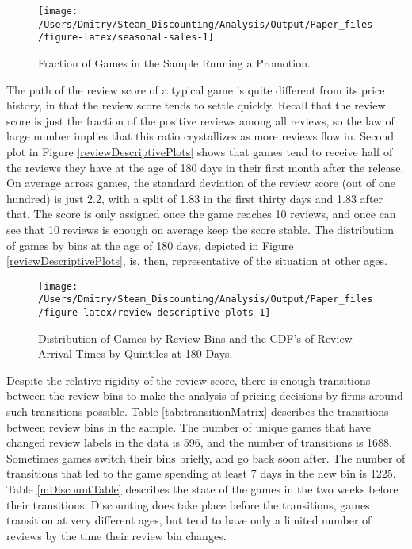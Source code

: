 \documentclass[12pt,pagebackref]{article}
\begin{document}
\begin{figure}[h]

{\centering \texttt{[image: /Users/Dmitry/Steam\_Discounting/Analysis/Output/Paper\_files/figure-latex/seasonal-sales-1]} 

}

\caption{\label{seasonalSales} Fraction of Games in the Sample Running a Promotion.}\label{fig:seasonal-sales}
\end{figure}

The path of the review score of a typical game is quite different from
its price history, in that the review score tends to settle quickly.
Recall that the review score is just the fraction of the positive
reviews among all reviews, so the law of large number implies that this
ratio crystallizes as more reviews flow in. Second plot in Figure
\ref{reviewDescriptivePlots} shows that games tend to receive half of
the reviews they have at the age of 180 days in their first month after
the release. On average across games, the standard deviation of the
review score (out of one hundred) is just 2.2, with a split of 1.83 in
the first thirty days and 1.83 after that. The score is only assigned
once the game reaches 10 reviews, and once can see that 10 reviews is
enough on average keep the score stable. The distribution of games by
bins at the age of 180 days, depicted in Figure
\ref{reviewDescriptivePlots}, is, then, representative of the situation
at other ages.

\begin{figure}[h]

{\centering \texttt{[image: /Users/Dmitry/Steam\_Discounting/Analysis/Output/Paper\_files/figure-latex/review-descriptive-plots-1]} 

}

\caption{\label{reviewDescriptivePlots} Distribution of Games by Review Bins and the CDF's of Review Arrival Times by Quintiles at 180 Days.}\label{fig:review-descriptive-plots}
\end{figure}

Despite the relative rigidity of the review score, there is enough
transitions between the review bins to make the analysis of pricing
decisions by firms around such transitions possible. Table
\ref{tab:transitionMatrix} describes the transitions between review bins
in the sample. The number of unique games that have changed review
labels in the data is 596, and the number of transitions is 1688.
Sometimes games switch their bins briefly, and go back soon after. The
number of transitions that led to the game spending at least 7 days in
the new bin is 1225. Table \ref{mDiscountTable} describes the state of
the games in the two weeks before their transitions. Discounting does
take place before the transitions, games transition at very different
ages, but tend to have only a limited number of reviews by the time
their review bin changes.
\end{document}
